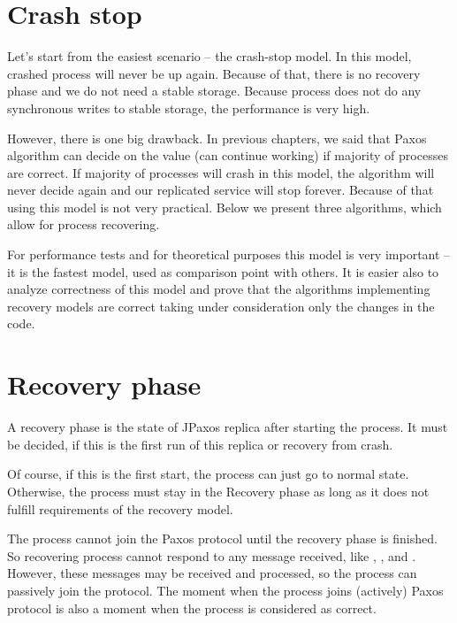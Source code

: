 \section{Crash stop}
\label{sec:crash_stop}

Let's start from the easiest scenario -- the crash-stop model. In this model, crashed process will never be up again.
Because of that, there is no recovery phase and we do not need a stable storage. Because process does not do any synchronous writes to stable storage, the performance is very high. 

However, there is one big drawback. In previous chapters, we said that Paxos algorithm can decide on the value (can continue working) if majority of processes are correct. If majority of processes will crash in this model, the algorithm will never decide again and our replicated service will stop forever. Because of that using this model is not very practical. Below we present three algorithms, which allow for process recovering.

For performance tests and for theoretical purposes this model is very important -- it is the fastest model, used as comparison point with others. It is easier also to analyze correctness of this model and prove that the algorithms implementing recovery models are correct taking under consideration only the changes in the code.

\section{Recovery phase}

A recovery phase is the state of JPaxos replica after starting the process. It must be decided, if this is the first run of this replica or recovery from crash.

Of course, if this is the first start, the process can just go to normal state. Otherwise, the process must stay in the Recovery phase as long as it does not fulfill requirements of the recovery model.

The process cannot join the Paxos protocol until the recovery phase is finished. \linebreak So recovering process cannot respond to any message received, like \propose[], \accept[], \prepare and \prepareOK[]. However, these messages may be received and processed, so the process can passively join the protocol. The moment when the process joins (actively) Paxos protocol is also a moment when the process is considered as correct.


